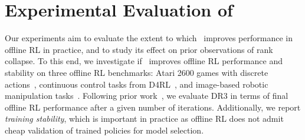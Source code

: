

\vspace{-0.2cm}
\section{Experimental Evaluation of \methodname}
\label{sec:experiments}
\vspace{-0.2cm}
Our experiments aim to evaluate the extent to which \methodname\ improves performance in offline RL in practice, and to study its effect on prior observations of rank collapse. To this end, we investigate if \methodname\ improves offline RL performance and stability on three offline RL benchmarks: Atari 2600 games with discrete actions~\citep{agarwal2019optimistic}, continuous control tasks from D4RL~\citep{fu2020d4rl}, and image-based robotic manipulation tasks~\citep{singh2020cog}.
Following prior work~\citep{fu2020d4rl, gulcehre2020rl}, we evaluate DR3 in terms of final offline RL performance after a given number of iterations. Additionally, we report \emph{training stability}, which is important in practice as offline RL does not admit cheap validation of trained policies for model selection.

